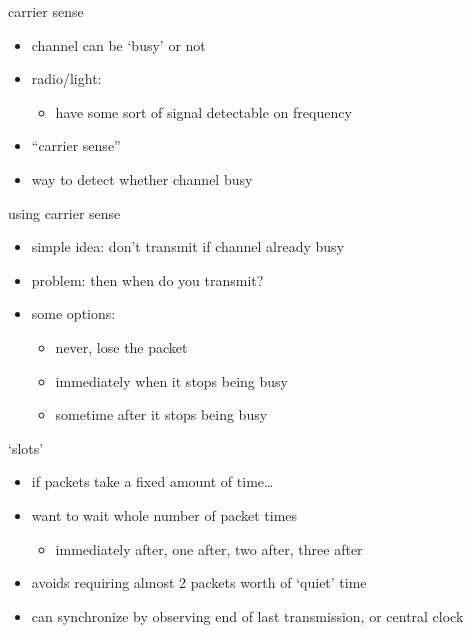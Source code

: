 \usetikzlibrary{arrows.meta}
\begin{frame}{carrier sense}
    \begin{itemize}
    \item channel can be `busy' or not
    \item radio/light:
        \begin{itemize}
        \item have some sort of signal detectable on frequency
        \end{itemize}
    \vspace{.5cm}
    \item ``carrier sense''
    \item way to detect whether channel busy
    \end{itemize}
\end{frame}

\begin{frame}{using carrier sense}
    \begin{itemize}
    \item simple idea: don't transmit if channel already busy
    \vspace{.5cm}
    \item problem: then when do you transmit?
    \item some options:
        \begin{itemize}
        \item never, lose the packet
        \item immediately when it stops being busy
        \item sometime after it stops being busy
        \end{itemize}
    \end{itemize}
\end{frame}

\begin{frame}{`slots'}
\begin{itemize}
\item if packets take a fixed amount of time\ldots
\item want to wait whole number of packet times
    \begin{itemize}
    \item immediately after, one after, two after, three after
    \end{itemize}
\item avoids requiring almost 2 packets worth of `quiet' time
\item can synchronize by observing end of last transmission, or central clock
\end{itemize}
\end{frame}

